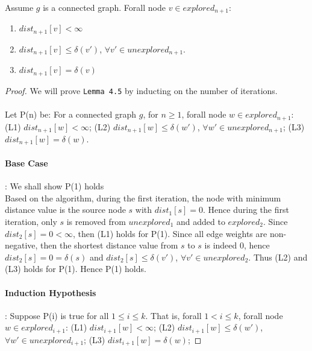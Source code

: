 \begin{sublemma}
Assume $g$ is a connected graph. Forall node $v \in explored_{n+1}$:
\begin{enumerate}
  \item $dist_{n+1}[v] < \infty$
  \item $dist_{n+1}[v]  \leq \delta(v')$, $\forall v' \in unexplored_{n+1}$.
  \item $dist_{n+1}[v] = \delta(v)$
\end{enumerate}
\end{sublemma}

\begin{proof}
We will prove \texttt{Lemma 4.5} by inducting on the number of iterations. 
\\\\
Let P(n) be: For a connected graph $g$, for $n \geq 1$, forall node $w \in explored_{n+1}$: (L1) $dist_{n+1}[w] < \infty$; (L2) $dist_{n+1}[w] \leq \delta(w')$, $\forall w' \in unexplored_{n+1}$; (L3) $dist_{n+1}[w] = \delta(w)$. 

\paragraph*{Base Case}: We shall show P(1) holds \\
Based on the algorithm, during the first iteration, the node with minimum distance value is the source node $s$ with $dist_1[s] = 0$. Hence during the first iteration, only $s$ is removed from $unexplored_1$ and added to $explored_2$. Since $dist_2[s] = 0 < \infty$, then (L1) holds for P(1). Since all edge weights are non-negative, then the shortest distance value from $s$ to $s$ is indeed $0$, hence $dist_2[s] = 0 = \delta(s)$ and $dist_2[s] \leq \delta(v')$, $\forall v' \in unexplored_2$. Thus (L2) and (L3) holds for P(1). Hence P(1) holds.

\paragraph*{Induction Hypothesis}: Suppose P(i) is true for all $1 \leq i \leq k$. That is, forall $1 < i \leq k$, forall node $w \in explored_{i+1}$: (L1) $dist_{i+1}[w] < \infty$; (L2) $dist_{i+1}[w] \leq \delta(w')$, $\forall w' \in unexplored_{i+1}$; (L3) $dist_{i+1}[w] = \delta(w)$; 


\end{proof}
